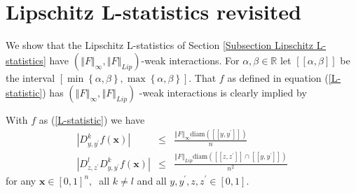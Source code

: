 \documentclass[final,12pt]{colt2018} %
\begin{document}
						\section{Lipschitz L-statistics revisited\label{Subsection Argument L-statistics}}
						We show that the Lipschitz L-statistics of Section \ref{Subsection Lipschitz
							L-statistics} have $\left( \left\Vert F\right\Vert _{\infty },\left\Vert
						F\right\Vert _{Lip}\right) $-weak interactions. For $\alpha ,\beta \in 
						\mathbb{R}
						$ let $\left[ \left[ \alpha ,\beta \right] \right] $ be the interval $\left[
						\min \left\{ \alpha ,\beta \right\} ,\max \left\{ \alpha ,\beta \right\} %
						\right] $. That $f$ as defined in equation (\ref{L-statistic}) has $\left(
						\left\Vert F\right\Vert _{\infty },\left\Vert F\right\Vert _{Lip}\right) $%
						-weak interactions is clearly implied by
						
						\begin{theorem}
							\label{Theorem LstatWeak}With $f$ as (\ref{L-statistic}) we have%
							\begin{eqnarray}
							\left\vert D_{y,y^{\prime }}^{k}f\left( \mathbf{x}\right) \right\vert  &\leq
							&\frac{\left\Vert F\right\Vert _{\infty }\text{diam}\left( \left[ \left[
								y,y^{\prime }\right] \right] \right) }{n}  \label{Lstat1 conditio} \\
							\left\vert D_{z,z^{\prime }}^{l}D_{y,y^{\prime }}^{k}f\left( \mathbf{x}%
							\right) \right\vert  &\leq &\frac{\left\Vert F\right\Vert _{Lip}\text{diam}%
								\left( \left[ \left[ z,z^{\prime }\right] \right] \cap \left[ \left[
								y,y^{\prime }\right] \right] \right) }{n^{2}}  \label{Lstat2 conditio}
							\end{eqnarray}%
							for any $\mathbf{x}\in \left[ 0,1\right] ^{n},$\textbf{\ }all $k\neq l$ and
							all $y,y^{\prime },z,z^{\prime }\in \left[ 0,1\right] $.
						\end{theorem}
						
\end{document}
